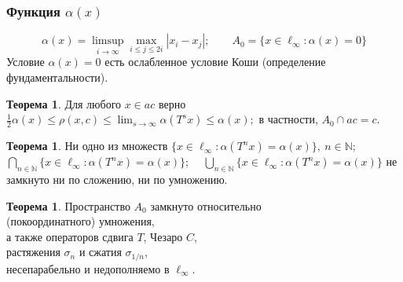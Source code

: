 \documentclass[10pt,pdf,hyperref={unicode},aspectratio=169,color={usenames, dvipsnames}]{beamer}
\theoremstyle{definition}
\newtheorem{ttheorem}[llemma]{Теорема}
\begin{document}
\begin{frame}
	\frametitle{Функция $\alpha(x)$}
	\begin{equation*}
		\alpha(x) = \limsup_{i\to\infty} \max_{i \leq j \leq 2i} |x_i-x_j|
		;\qquad
		A_0 = \{x\in\ell_\infty : \alpha(x) = 0\}
	\end{equation*}
	Условие $\alpha(x) = 0$ есть ослабленное условие Коши (определение фундаментальности).

	\begin{ttheorem}
		Для любого $x\in ac$ верно
		$\displaystyle
			\frac{1}{2} \alpha(x) \leq \rho(x,c)\leq \lim_{s\to\infty} \alpha(T^s x) \leq \alpha(x)
			;
		$
		в частности, $A_0 \cap ac = c$.
	\end{ttheorem}


	\begin{ttheorem}
		Ни одно из множеств
		$\displaystyle
			\{x \in \ell_\infty : \alpha(T^n x) = \alpha(x) \}, ~n\in\mathbb{N};
		$~
		$\displaystyle
			\bigcap\limits_{n\in\mathbb{N}}\{x \in \ell_\infty : \alpha(T^n x) = \alpha(x) \};
		$ ~
		$\displaystyle
			\bigcup_{n\in\mathbb{N}}\{x \in \ell_\infty : \alpha(T^n x) = \alpha(x) \}
		$ не замкнуто ни по сложению, ни по умножению.
	\end{ttheorem}

	\begin{ttheorem}
		Пространство $A_0$ замкнуто относительно
		\\
		(покоординатного) умножения,
		\\
		а также операторов сдвига $T$, Чезаро $C$,
		\\
		растяжения $\sigma_n$ и сжатия $\sigma_{1/n}$,
		\\
		несепарабельно и недополняемо в $\ell_\infty$.
	\end{ttheorem}

\end{frame}



\def\rinc{\color[rgb]{0.5,0,0}{(РИНЦ)~}}
\def\vak{\color[rgb]{0.5,0.5,0}{(ВАК)~}}
\def\mzm{\color[rgb]{0,0.5,0}{(WoS)~(Scopus)~}}

\end{document}
